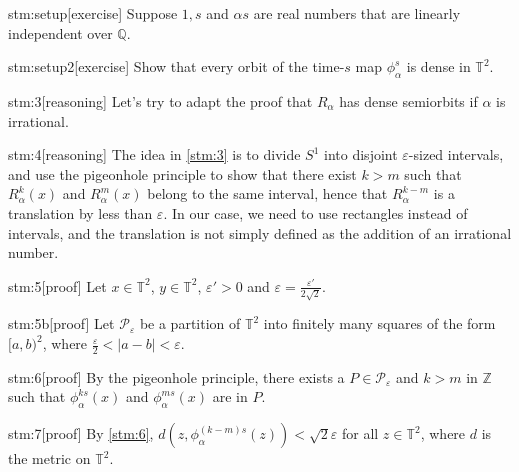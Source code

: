
\begin{stm}{stm:setup}[exercise]
Suppose $1, s$ and $\alpha s$ are real numbers that are linearly independent over $\mathbb{Q}$.
\end{stm}

\begin{stm}{stm:setup2}[exercise]
Show that every orbit of the time-$s$ map $\phi_\alpha^s$ is dense in $\mathbb{T}^2$.
\end{stm}


\begin{stm}{stm:3}[reasoning]
Let's try to adapt the proof that $R_\alpha$ has dense semiorbits if $\alpha$ is irrational.
\end{stm}

\begin{stm}{stm:4}[reasoning]
The idea in \ref{stm:3} is to divide $S^1$ into disjoint $\varepsilon$-sized intervals, and use the pigeonhole principle to show that there exist $k > m$ such that $R_\alpha^k(x)$ and $R_\alpha^m(x)$ belong to the same interval, hence that $R_\alpha^{k-m}$ is a translation by less than $\varepsilon$. In our case, we need to use rectangles instead of intervals, and the translation is not simply defined as the addition of an irrational number.
\end{stm}

\begin{stm}{stm:5}[proof]
Let $x \in \mathbb{T}^2$, $y \in \mathbb{T}^2$, $\varepsilon' > 0$ and $\varepsilon = \frac{\varepsilon'}{2\sqrt{2}}$. 
\end{stm}

\begin{stm}{stm:5b}[proof]
Let $\mathcal{P}_\varepsilon$ be a partition of $\mathbb{T}^2$ into finitely many squares of the form $[a,b)^2$, where $\frac{\varepsilon}{2} < |a-b| < \varepsilon$.
\end{stm}

\begin{stm}{stm:6}[proof]
By the pigeonhole principle, there exists a $P \in \mathcal{P}_\varepsilon$ and $k > m$ in $\mathbb{Z}$ such that $\phi_\alpha^{ks}(x)$ and $\phi_\alpha^{ms}(x)$ are in $P$.
\end{stm}

\begin{stm}{stm:7}[proof]
By \ref{stm:6}, $d(z, \phi_\alpha^{(k-m)s}(z)) < \sqrt{2} \varepsilon$ for all $z \in \mathbb{T}^2$, where $d$ is the metric on $\mathbb{T}^2$.
\end{stm}

